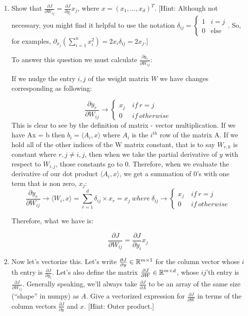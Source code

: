 \documentclass{article}
\theoremstyle{plain}
\theoremstyle{definition}
\begin{document}
\begin{enumerate}
\setcounter{enumi}{\value{saveenum}}
\item Show that $\frac{\partial J}{\partial W_{ij}}=\frac{\partial J}{\partial y_{i}}x_{j}$,
where $x=\left(x_{1},\ldots,x_{d}\right)^{T}$. {[}Hint: Although
not necessary, you might find it helpful to use the notation $\delta_{ij}=\begin{cases}
1 & i=j\\
0 & \text{else}
\end{cases}$. So, for examples, $\partial_{x_{j}}\left(\sum_{i=1}^{n}x_{i}^{2}\right)=2x_{i}\delta_{ij}=2x_{j}$.{]}

\subitem 

To answer this question we must calculate $\frac{\partial y_r}{\partial W_{ij}}$:

If we nudge the entry $i,j$ of the weight matrix $W$ we have changes corresponding as following:

$$
    \frac{\partial y_r}{\partial W_{ij}} \rightarrow \begin{cases}
    x_j & \ if \ r=j \\
    0 & \ if \ otherwise
    \end{cases}
$$
This is clear to see by the definition of matrix - vector multiplication. If we have Ax = b then $b_i = \langle A_i,x\rangle$ where $A_i$ is the $i^{th}$ row of the matrix A. If we hold all of the other indices of the W matrix constant, that is to say $W_{r,k}$ is constant where $r,j \neq i,j$, then when we take the partial derivative of $y$ with respect to $W_{i,j}$, those constants go to 0. Therefore, when we evaluate the derivative of our dot product $\langle A_i,x\rangle$, we get a summation of 0's with one term that is non zero, $x_j$:
$$
   \frac{\partial y_r}{\partial W_{ij}} \rightarrow \langle W_i, x\rangle = \sum_{r=1}^d \delta_{ij} \times x_r = x_j \ where \ \delta_{ij} \rightarrow \begin{cases}
    x_j & \ if \ r=j \\
    0 & \ if \ otherwise
    \end{cases}
$$

Therefore, what we have is:

$$
\frac{\partial J}{\partial W_{ij}}=\frac{\partial J}{\partial y_{i}}x_{j}
$$



\item Now let's vectorize this. Let's write $\frac{\partial J}{\partial y}\in\mathbb{R}^{m\times1}$
for the column vector whose $i$th entry is $\frac{\partial J}{\partial y_{i}}$.
Let's also define the matrix $\frac{\partial J}{\partial W}\in\mathbb{R}^{m\times d}$,
whose $ij$'th entry is $\frac{\partial J}{\partial W_{ij}}$. Generally
speaking, we'll always take $\frac{\partial J}{\partial A}$ to be
an array of the same size (``shape'' in numpy) as $A$. Give a vectorized
expression for $\frac{\partial J}{\partial W}$ in terms of the column
vectors $\frac{\partial J}{\partial y}$ and $x$. {[}Hint: Outer
product.{]}\\


\end{enumerate}
\end{document}
